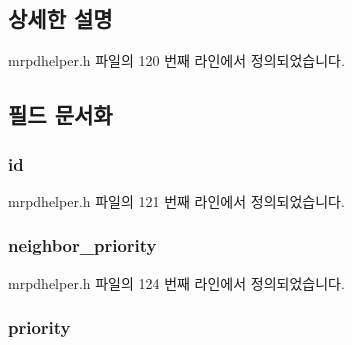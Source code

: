\subsection{상세한 설명}


mrpdhelper.\+h 파일의 120 번째 라인에서 정의되었습니다.



\subsection{필드 문서화}
\subsubsection[{\texorpdfstring{id}{id}}]{ id}\hypertarget{structmrpdhelper__msrp__domain_abaabdc509cdaba7df9f56c6c76f3ae19}{}\label{structmrpdhelper__msrp__domain_abaabdc509cdaba7df9f56c6c76f3ae19}


mrpdhelper.\+h 파일의 121 번째 라인에서 정의되었습니다.

\subsubsection[{\texorpdfstring{neighbor\+\_\+priority}{neighbor_priority}}]{ neighbor\+\_\+priority}\hypertarget{structmrpdhelper__msrp__domain_a5f123157905f61ce118a08f1d52589f5}{}\label{structmrpdhelper__msrp__domain_a5f123157905f61ce118a08f1d52589f5}


mrpdhelper.\+h 파일의 124 번째 라인에서 정의되었습니다.

\subsubsection[{\texorpdfstring{priority}{priority}}]{ priority}\hypertarget{structmrpdhelper__msrp__domain_a90249de64da5ae5d7acd34da7ea1b857}{}\label{structmrpdhelper__msrp__domain_a90249de64da5ae5d7acd34da7ea1b857}



